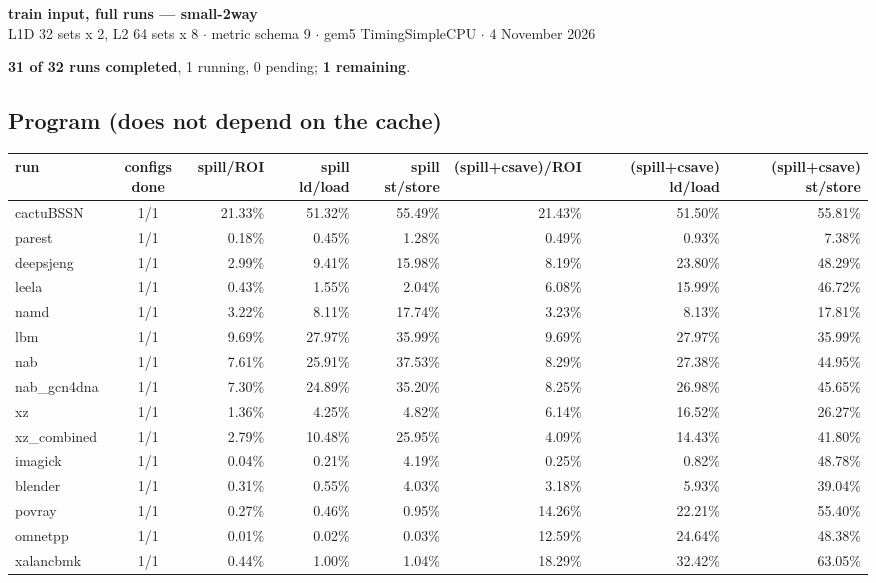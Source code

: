 \documentclass[10pt,a4paper,landscape]{article}
\begin{document}
\begin{center}
{\large\bfseries train input, full runs --- small-2way}\\[3pt]
{\small L1D 32 sets x 2, L2 64 sets x 8 $\cdot$ metric schema 9 $\cdot$ gem5 TimingSimpleCPU $\cdot$ 4 November 2026}
\end{center}
\textbf{31 of 32 runs completed}, 1 running, 0 pending; \textbf{1 remaining}.\par
\subsection*{Program (does not depend on the cache)}
{\footnotesize
\begin{longtable}{lcrrrrrr}
\toprule
run & configs done & spill/ROI & spill ld/load & spill st/store & (spill+csave)/ROI & (spill+csave) ld/load & (spill+csave) st/store \\
\midrule
\endhead
\bottomrule
\endfoot
cactuBSSN & 1/1 & 21.33\% & 51.32\% & 55.49\% & 21.43\% & 51.50\% & 55.81\% \\
parest & 1/1 & 0.18\% & 0.45\% & 1.28\% & 0.49\% & 0.93\% & 7.38\% \\
deepsjeng & 1/1 & 2.99\% & 9.41\% & 15.98\% & 8.19\% & 23.80\% & 48.29\% \\
leela & 1/1 & 0.43\% & 1.55\% & 2.04\% & 6.08\% & 15.99\% & 46.72\% \\
namd & 1/1 & 3.22\% & 8.11\% & 17.74\% & 3.23\% & 8.13\% & 17.81\% \\
lbm & 1/1 & 9.69\% & 27.97\% & 35.99\% & 9.69\% & 27.97\% & 35.99\% \\
nab & 1/1 & 7.61\% & 25.91\% & 37.53\% & 8.29\% & 27.38\% & 44.95\% \\
nab\_gcn4dna & 1/1 & 7.30\% & 24.89\% & 35.20\% & 8.25\% & 26.98\% & 45.65\% \\
xz & 1/1 & 1.36\% & 4.25\% & 4.82\% & 6.14\% & 16.52\% & 26.27\% \\
xz\_combined & 1/1 & 2.79\% & 10.48\% & 25.95\% & 4.09\% & 14.43\% & 41.80\% \\
imagick & 1/1 & 0.04\% & 0.21\% & 4.19\% & 0.25\% & 0.82\% & 48.78\% \\
blender & 1/1 & 0.31\% & 0.55\% & 4.03\% & 3.18\% & 5.93\% & 39.04\% \\
povray & 1/1 & 0.27\% & 0.46\% & 0.95\% & 14.26\% & 22.21\% & 55.40\% \\
omnetpp & 1/1 & 0.01\% & 0.02\% & 0.03\% & 12.59\% & 24.64\% & 48.38\% \\
xalancbmk & 1/1 & 0.44\% & 1.00\% & 1.04\% & 18.29\% & 32.42\% & 63.05\% \\

\end{longtable}}
\end{document}
